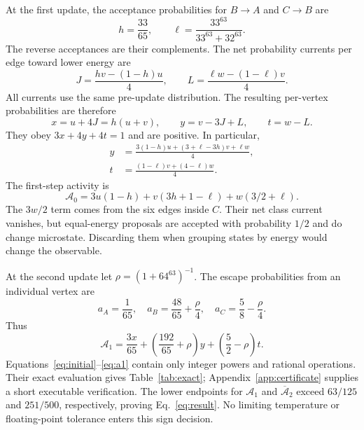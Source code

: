 \documentclass[aps,pre,reprint,longbibliography,nofootinbib,floatfix]{revtex4-2}
\newcommand{\Act}{\mathcal A}
\begin{document}
At the first update, the acceptance probabilities for $B\to A$ and
$C\to B$ are
\begin{equation}
h=\frac{33}{65},\qquad
\ell=\frac{33^{63}}{33^{63}+32^{63}}.
\label{eq:accept1}
\end{equation}
The reverse acceptances are their complements. The net probability currents
per edge toward lower energy are
\begin{equation}
J=\frac{hv-(1-h)u}{4},\qquad
L=\frac{\ell w-(1-\ell)v}{4}.
\label{eq:currents}
\end{equation}
All currents use the same pre-update distribution. The resulting
per-vertex probabilities are therefore
\begin{equation}
x=u+4J=h(u+v),\qquad y=v-3J+L,\qquad t=w-L.
\label{eq:p1}
\end{equation}
They obey $3x+4y+4t=1$ and are positive. In particular,
\begin{align}
y&=\frac{3(1-h)u+(3+\ell-3h)v+\ell w}{4},\nonumber\\
t&=\frac{(1-\ell)v+(4-\ell)w}{4}.
\end{align}
The first-step activity is
\begin{equation}
\Act_0=3u(1-h)+v(3h+1-\ell)+w(3/2+\ell).
\label{eq:a0}
\end{equation}
The $3w/2$ term comes from the six edges inside $C$. Their net class
current vanishes, but equal-energy proposals are accepted with probability
$1/2$ and do change microstate. Discarding them when grouping states by
energy would change the observable.

At the second update let $\rho=(1+64^{63})^{-1}$. The escape probabilities
from an individual vertex are
\begin{equation}
a_A=\frac1{65},\quad
a_B=\frac{48}{65}+\frac{\rho}{4},\quad
a_C=\frac58-\frac{\rho}{4}.
\label{eq:escape2}
\end{equation}
Thus
\begin{equation}
\Act_1=\frac{3x}{65}+
\left(\frac{192}{65}+\rho\right)y+
\left(\frac52-\rho\right)t.
\label{eq:a1}
\end{equation}
Equations~\eqref{eq:initial}--\eqref{eq:a1} contain only integer powers and
rational operations. Their exact evaluation gives Table~\ref{tab:exact};
Appendix~\ref{app:certificate} supplies a short executable verification.
The lower endpoints for $\Act_1$ and $\overline{\Act}_2$ exceed
$63/125$ and $251/500$, respectively, proving Eq.~\eqref{eq:result}.
No limiting temperature or floating-point tolerance
enters this sign decision.
\end{document}

